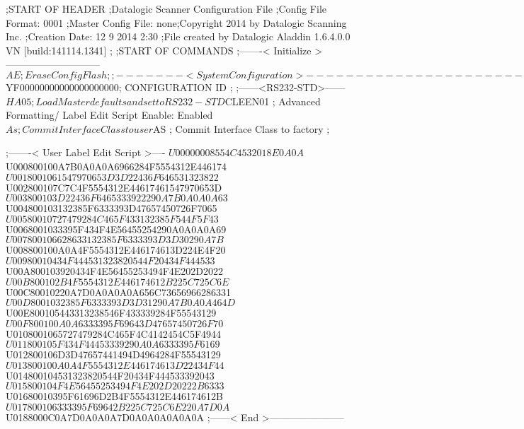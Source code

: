 ;START OF HEADER
;Datalogic Scanner Configuration File
;Config File Format: 0001
;Master Config File: none;Copyright 2014 by Datalogic Scanning Inc.
;Creation Date: 12 9 2014 2:30
;File created by Datalogic Aladdin 1.6.4.0.0 VN [build:141114.1341]
;
;START OF COMMANDS
;-------< Initialize >-----------------------------
$AE                 ; Erase Config Flash
;
;-------< System Configuration >-------------------------------
$YF00000000000000000000; CONFIGURATION ID
;
;------<RS232-STD>------
$HA05               ; Load Master defaults and set to RS232-STD
$CLEEN01            ; Advanced Formatting/ Label Edit Script Enable: Enabled
$As                 ; Commit Interface Class to user
$AS                 ; Commit Interface Class to factory
;

;-------< User Label Edit Script >----
$U00000008554C4532018E0A0A
$U000800100A7B0A0A0A6966284F5554312E446174
$U0018001061547970653D3D22436F646531323822
$U002800107C7C4F5554312E44617461547970653D
$U003800103D22436F6465333922290A7B0A0A0A63
$U004800103132385F6333393D47657450726F7065
$U00580010727479284C465F433132385F544F5F43
$U0068001033395F434F4E56455254290A0A0A0A69
$U007800106628633132385F6333393D3D30290A7B
$U008800100A0A4F5554312E446174613D224E4F20
$U00980010434F444531323820544F20434F444533
$U00A800103920434F4E56455253494F4E202D2022
$U00B800102B4F5554312E446174612B225C725C6E
$U00C80010220A7D0A0A0A0A656C73656966286331
$U00D8001032385F6333393D3D31290A7B0A0A464D
$U00E800105443313238546F433339284F55543129
$U00F800100A0A6333395F69643D47657450726F70
$U0108001065727479284C465F4C4142454C5F4944
$U011800105F434F44453339290A0A6333395F6169
$U012800106D3D47657441494D4964284F55543129
$U013800100A0A4F5554312E446174613D22434F44
$U014800104531323820544F20434F444533392043
$U015800104F4E56455253494F4E202D20222B6333
$U01680010395F61696D2B4F5554312E446174612B
$U017800106333395F69642B225C725C6E220A7D0A
$U0188000C0A7D0A0A0A7D0A0A0A0A0A0A
;------< End >-----------------------
